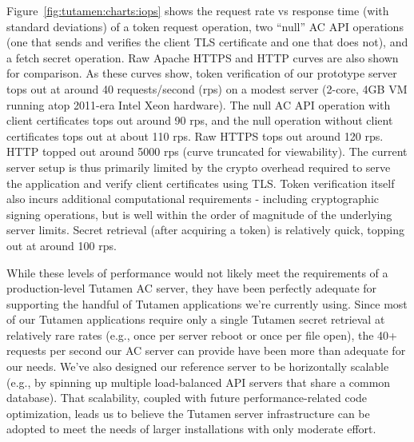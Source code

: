Figure~\ref{fig:tutamen:charts:iops} shows the request rate vs response time
(with standard deviations) of a token request operation, two ``null''
AC API operations (one that sends and verifies the client TLS
certificate and one that does not), and a fetch secret operation. Raw
Apache HTTPS and HTTP curves are also shown for comparison. As these
curves show, token verification of our prototype server tops out at
around 40 requests/second (rps) on a modest server (2-core, 4GB VM
running atop 2011-era Intel Xeon hardware). The null AC API operation
with client certificates tops out around 90 rps, and the null
operation without client certificates tops out at about 110 rps. Raw
HTTPS tops out around 120 rps. HTTP topped out around 5000 rps (curve
truncated for viewability). The current server setup is thus primarily
limited by the crypto overhead required to serve the application and
verify client certificates using TLS. Token verification itself also
incurs additional computational requirements - including cryptographic
signing operations, but is well within the order of magnitude of the
underlying server limits. Secret retrieval (after acquiring a token)
is relatively quick, topping out at around 100 rps.

While these levels of performance would not likely meet the
requirements of a production-level Tutamen AC server, they have been
perfectly adequate for supporting the handful of Tutamen applications
we're currently using. Since most of our Tutamen applications require
only a single Tutamen secret retrieval at relatively rare rates (e.g.,
once per server reboot or once per file open), the 40+ requests per
second our AC server can provide have been more than adequate for our
needs. We've also designed our reference server to be horizontally
scalable (e.g., by spinning up multiple load-balanced API servers that
share a common database). That scalability, coupled with future
performance-related code optimization, leads us to believe the Tutamen
server infrastructure can be adopted to meet the needs of larger
installations with only moderate effort.


